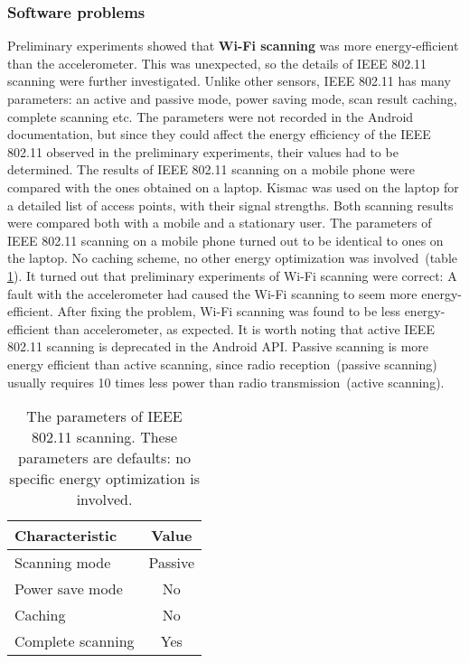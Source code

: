 \subsubsection{Software problems}
\hspace{10pt} Preliminary experiments showed that \textbf{Wi-Fi scanning} was more energy-efficient than the accelerometer. This was unexpected, so the details of IEEE 802.11 scanning were further investigated. Unlike other sensors, IEEE 802.11 has many parameters: an active and passive mode, power saving mode, scan result caching, complete scanning etc. The parameters were not recorded in the Android documentation, but since they could affect the energy efficiency of the IEEE 802.11 observed in the preliminary experiments, their values had to be determined. The results of IEEE 802.11 scanning on a mobile phone were compared with the ones obtained on a laptop. Kismac \cite{kismac:kismac} was used on the laptop for a detailed list of access points, with their signal strengths. Both scanning results were compared both with a mobile and a stationary user. The parameters of IEEE 802.11 scanning on a mobile phone turned out to be identical to ones on the laptop. No caching scheme, no other energy optimization was involved\ (table \ref{table:wifiparameters}). It turned out that preliminary experiments of Wi-Fi scanning were correct: A fault with the accelerometer had caused the Wi-Fi scanning to seem more energy-efficient. After fixing the problem, Wi-Fi scanning was found to be less energy-efficient than accelerometer, as expected. It is worth noting that active IEEE 802.11 scanning is deprecated in the Android API. Passive scanning is more energy efficient than active scanning, since radio reception\ (passive scanning) usually requires 10 times less power than radio transmission\ (active scanning).

\begin{table}[H]
\centering
    \begin{tabular}{| l | c |}
    \hline
    	Characteristic & Value \\ \hline
    	Scanning mode & Passive \\ \hline
    	Power save mode & No \\ \hline
    	Caching & No \\ \hline
    	Complete scanning & Yes \\ \hline
    \end{tabular}
    \caption{The parameters of IEEE 802.11 scanning. These parameters are defaults: no specific energy optimization is involved.}
	\label{table:wifiparameters}
\end{table}

